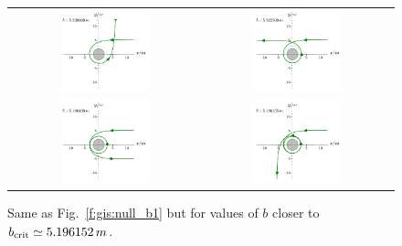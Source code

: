\begin{figure}
\begin{tabular}{cc}
\includegraphics[width=0.48\textwidth]{ges_null_b_5_230000.pdf} &
\includegraphics[width=0.48\textwidth]{ges_null_b_5_202500.pdf} \\
\includegraphics[width=0.48\textwidth]{ges_null_b_5_196430.pdf} &
\includegraphics[width=0.48\textwidth]{ges_null_b_5_196155.pdf}
\end{tabular}
\caption[]{\label{f:gis:null_b2} \footnotesize
Same as Fig.~\ref{f:gis:null_b1} but for values of $b$ closer to
$b_{\rm crit} \simeq 5.196152\, m$.}
\end{figure}

